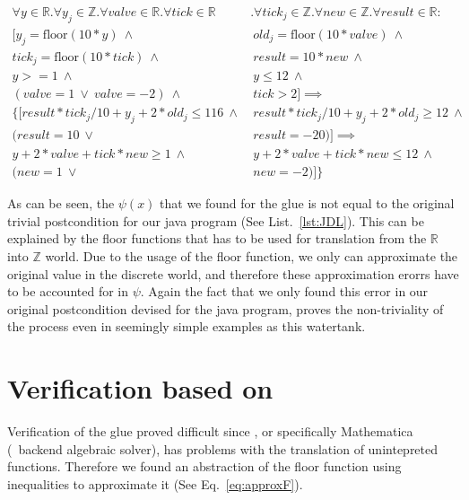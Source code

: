 \begin{equation}
	\begin{split}
		\forall y \in \mathbb{R} . \forall y_j \in \mathbb{Z}. \forall valve \in \mathbb{R}. \forall tick \in \mathbb{R}&. \forall tick_j \in \mathbb{Z} . \forall new \in \mathbb{Z}. \forall result \in \mathbb{R} : \\  [y_j = \textrm{floor}(10 * y)~\wedge&~ old_j = \textrm{floor}(10*valve) ~\wedge \\ tick_j = \textrm{floor}(10*tick)~\wedge&~result = 10 * new~\wedge \\ y >= 1~\wedge&~y \leq 12~\wedge \\ (valve = 1 ~\vee~valve = -2)~\wedge&~tick > 2] \implies \\  \{[result * tick_j/10 + y_j + 2 * old_j \leq 116~\wedge&~result * tick_j/10 + y_j + 2 * old_j \geq 12~\wedge \\ (result = 10~\vee&~result = -20)] \implies \\ y + 2 * valve + tick * new \geq 1~\wedge&~y + 2 * valve + tick * new \leq 12~\wedge \\ (new = 1~\vee&~new = -2)]\}
	\end{split}
	\label{eq:glueWatertank}
\end{equation}

As can be seen, the \(\psi(x)\) that we found for the glue is not equal to the original trivial postcondition for our java program (See List.~\ref{lst:JDL}). This can be explained by the floor functions that has to be used for translation from the \(\mathbb{R}\) into \(\mathbb{Z}\) world. Due to the usage of the floor function, we only can approximate the original value in the discrete world, and therefore these approximation erorrs have to be accounted for in \(\psi\). Again the fact that we only found this error in our original postcondition devised for the java program, proves the non-triviality of the process even in seemingly simple examples as this watertank.

\section{Verification based on \keym}
\label{sec:Watertank:Verification}

Verification of the glue proved difficult since \keym, or specifically Mathematica (\keym~backend algebraic solver), has problems with the translation of unintepreted functions. Therefore we found an abstraction of the floor function using inequalities to approximate it (See Eq.~\ref{eq:approxF}). 

